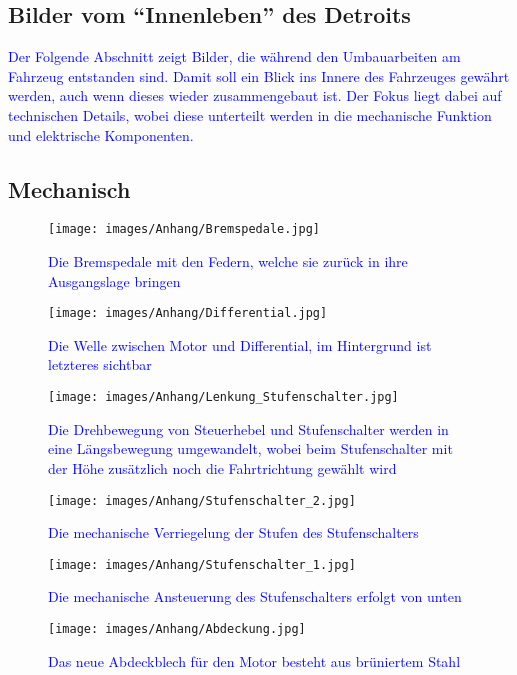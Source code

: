 \begin{landscape}\chapter{Bilder vom "`Innenleben"' des Detroits}

\textcolor{blue}{Der Folgende Abschnitt zeigt Bilder, die während den Umbauarbeiten am Fahrzeug entstanden sind. Damit soll ein Blick ins Innere des Fahrzeuges gewährt werden, auch wenn dieses wieder zusammengebaut ist. Der Fokus liegt dabei auf technischen Details, wobei diese unterteilt werden in die mechanische Funktion und elektrische Komponenten.}


\section{Mechanisch}
\begin{figure}[h]
	\centering
		\texttt{[image: images/Anhang/Bremspedale.jpg]}
	\caption{\textcolor{blue}{Die Bremspedale mit den Federn, welche sie zurück in ihre Ausgangslage bringen}}
	\label{fig:Bremspedale}
\end{figure}
\begin{figure}[h]
	\centering
		\texttt{[image: images/Anhang/Differential.jpg]}
	\caption{\textcolor{blue}{Die Welle zwischen Motor und Differential, im Hintergrund ist letzteres sichtbar}}
	\label{fig:Differential}
\end{figure}
\begin{figure}[h]
	\centering
		\texttt{[image: images/Anhang/Lenkung\_Stufenschalter.jpg]}
	\caption{\textcolor{blue}{Die Drehbewegung von Steuerhebel und Stufenschalter werden in eine Längsbewegung umgewandelt, wobei beim Stufenschalter mit der Höhe zusätzlich noch die Fahrtrichtung gewählt wird}}
	\label{fig:Lenkung_Stufenschalter}
\end{figure}
\begin{figure}[h]
	\centering
		\texttt{[image: images/Anhang/Stufenschalter\_2.jpg]}
	\caption{\textcolor{blue}{Die mechanische Verriegelung der Stufen des Stufenschalters}}
	\label{fig:Stufenschalter_2}
\end{figure}
\begin{figure}[h]
	\centering
		\texttt{[image: images/Anhang/Stufenschalter\_1.jpg]}
	\caption{\textcolor{blue}{Die mechanische Ansteuerung des Stufenschalters erfolgt von unten}}
	\label{fig:Stufenschalter_1}
\end{figure}
\begin{figure}[h]
	\centering
		\texttt{[image: images/Anhang/Abdeckung.jpg]}
	\caption{\textcolor{blue}{Das neue Abdeckblech für den Motor besteht aus brüniertem Stahl}}
	\label{fig:Abdeckung}
\end{figure}\end{landscape}